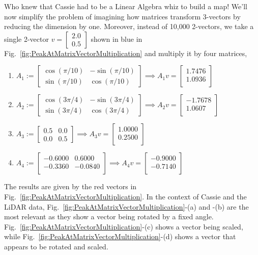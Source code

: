 Who knew that Cassie had to be a Linear Algebra whiz to build a map! We'll now simplify the problem of imagining how matrices transform 3-vectors by reducing the dimension by one. Moreover, instead of 10,000 2-vectors, we take a single 2-vector $v= \begin{bmatrix} 2.0 \\ 0.5 \end{bmatrix}$ shown in blue in Fig.~\ref{fig:PeakAtMatrixVectorMultiplication} and multiply it by four matrices, 
\begin{enumerate}
\setlength{\itemsep}{.2cm}
\renewcommand{\labelenumi}{(\alph{enumi})}
\item $A_1:=\left[\begin{array}{rr} \cos(\pi/10) & -\sin(\pi/10) \\  \sin(\pi/10) & \cos(\pi/10)\end{array} \right] \implies A_1 v = \left[
\begin{array}{c}
1.7476 \\
1.0936 \\
\end{array}
\right]$
\item $A_2:=\left[\begin{array}{rr} \cos(3 \pi/4) & -\sin(3 \pi/4) \\  \sin(3 \pi/4) & \cos(3 \pi/4)\end{array} \right] \implies A_2 v = \left[
\begin{array}{r}
-1.7678 \\
1.0607 \\
\end{array}
\right]$
\item $A_3:=\left[\begin{array}{rr} 0.5 & 0.0 \\  0.0 & 0.5\end{array} \right] \implies A_3 v = \left[\begin{array}{r}
1.0000 \\
0.2500 \\
\end{array}
\right]$
\item $A_4:=\left[
\begin{array}{rr}
-0.6000 & 0.6000 \\
-0.3360 & -0.0840 \\
\end{array}
\right] \implies A_4 v = \left[
\begin{array}{c}
-0.9000 \\
-0.7140 \\
\end{array}
\right]$
\end{enumerate}
The results are given by the red vectors in Fig.~\ref{fig:PeakAtMatrixVectorMultiplication}. In the context of Cassie and the LiDAR data, Fig.~\ref{fig:PeakAtMatrixVectorMultiplication}-(a) and -(b) are the most relevant as they show a vector being rotated by a fixed angle. Fig.~\ref{fig:PeakAtMatrixVectorMultiplication}-(c) shows a vector being scaled, while Fig.~\ref{fig:PeakAtMatrixVectorMultiplication}-(d) shows a vector that appears to be rotated and scaled. 


